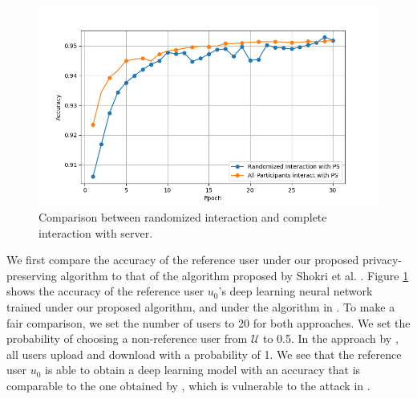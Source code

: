 \documentclass[conference]{IEEEtran}
\begin{document}

\begin{figure}[!h]
\centering
\includegraphics[width=0.9\columnwidth, keepaspectratio]{RandomVsAllGrid}
\caption{Comparison between randomized interaction and complete interaction with server. }
\label{fig:RandVsAll}
\end{figure}
We first compare the accuracy of the reference user under our proposed privacy-preserving algorithm to that of the algorithm proposed
by Shokri et al. \cite{shokri2015privacy}. 
Figure \ref{fig:RandVsAll} shows the accuracy of the reference user $u_0$'s deep learning
neural network trained under our proposed algorithm, and under the algorithm in \cite{shokri2015privacy}. To make a fair comparison, 
we  set the number of users to 20 for both approaches. We set the probability of choosing a non-reference user from $\mathcal{U}$ to
0.5.  In the approach by \cite{shokri2015privacy}, all users upload and download with a probability of 1. 
We see that the reference user $u_0$ is able to obtain a deep learning model with an accuracy that is comparable to the one
obtained by \cite{shokri2015privacy}, which is vulnerable to the attack in \cite{hitaj2017deep}.
\end{document}
